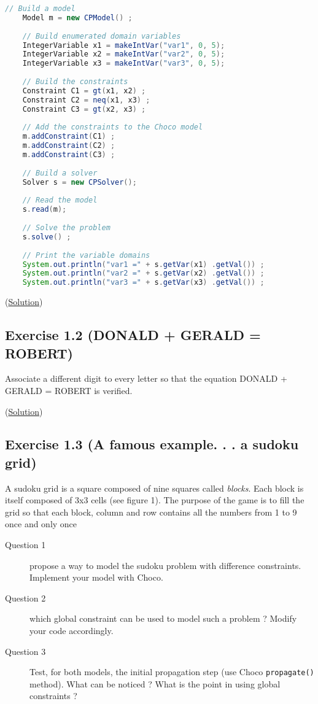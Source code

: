 \begin{lstlisting}[language={java}, title={\textbf{Algorithm 1} Mysterious model.}]
	// Build a model
	Model m = new CPModel() ;
	
	// Build enumerated domain variables
	IntegerVariable x1 = makeIntVar("var1", 0, 5);
	IntegerVariable x2 = makeIntVar("var2", 0, 5);
	IntegerVariable x3 = makeIntVar("var3", 0, 5);
	
	// Build the constraints
	Constraint C1 = gt(x1, x2) ;
	Constraint C2 = neq(x1, x3) ;
	Constraint C3 = gt(x2, x3) ;
	
	// Add the constraints to the Choco model
	m.addConstraint(C1) ;
	m.addConstraint(C2) ;
	m.addConstraint(C3) ;
	
	// Build a solver
	Solver s = new CPSolver();
	
	// Read the model
	s.read(m);
	
	// Solve the problem
	s.solve() ;
	
	// Print the variable domains
	System.out.println("var1 =" + s.getVar(x1) .getVal()) ;
	System.out.println("var2 =" + s.getVar(x2) .getVal()) ;
	System.out.println("var3 =" + s.getVar(x3) .getVal()) ;
\end{lstlisting}

(\hyperlink{solutions:solutionofexercise1.1}{Solution})

\subsection{Exercise 1.2 (DONALD +  GERALD = ROBERT)}\label{exercises:exercise1.2}\hypertarget{exercises:exercise1.2}{}
Associate a different digit to every letter so that the equation DONALD + GERALD = ROBERT is verified.

(\hyperlink{solutions:solutionofexercise1.2}{Solution})

\subsection{Exercise 1.3 (A famous example. . . a sudoku grid)}\label{exercises:exercise1.3}\hypertarget{exercises:exercise1.3}{}
A sudoku grid is a square composed of nine squares called \emph{blocks}. Each block is itself composed of 3x3 cells
(see figure 1). The purpose of the game is to fill the grid so that each block, column and row contains all the
numbers from 1 to 9 once and only once

\begin{description}
	\item[Question 1] propose a way to model the sudoku problem with difference constraints. Implement your model with Choco.
	\item[Question 2] which global constraint can be used to model such a problem ? Modify your code accordingly.
	\item[Question 3] Test, for both models, the initial propagation step (use Choco \texttt{propagate()} method). What can be noticed ? What is the point in using global constraints ?
\end{description}

